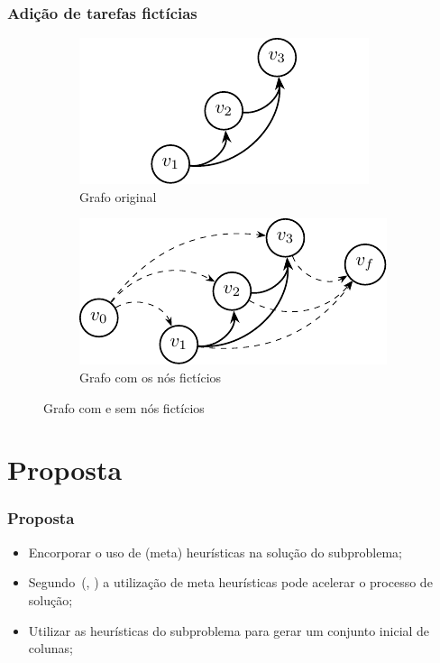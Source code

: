 \documentclass{beamer}
\newcommand{\ccite}[1]{(\citeauthor{#1}, \citeyear{#1})}
\begin{document}
\begin{frame}
    \frametitle{Adição de tarefas fictícias}

    \begin{figure}[!htb]
        \centering
        \begin{subfigure}[t]{0.49\textwidth}
            \centering
            \includegraphics[width=1\linewidth]{figuras/graph2.pdf}
            \caption{Grafo original}
            \label{graph2}
        \end{subfigure}
        \begin{subfigure}[t]{0.49\textwidth}
            \centering
            \includegraphics[width=1\linewidth]{figuras/graph3.pdf}
            \caption{Grafo com os nós fictícios}
            \label{graph2}
        \end{subfigure}
        \caption{Grafo com e sem nós fictícios}
    \end{figure}
\end{frame}

\section{Proposta}
\begin{frame}
    \frametitle{Proposta}
    \begin{itemize}
        \item Encorporar o uso de (meta) heurísticas na solução do subproblema;
        \item Segundo~\ccite{dos2008metodo} a utilização de meta heurísticas pode acelerar o processo de solução;
        \item Utilizar as heurísticas do subproblema para gerar um conjunto inicial de colunas;
    \end{itemize}
\end{frame}
\end{document}
